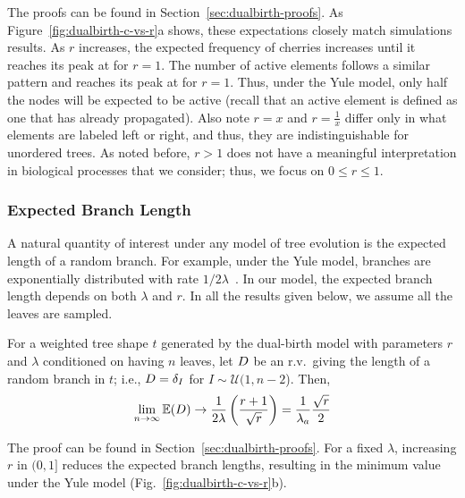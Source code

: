 The proofs can be found in Section~\ref{sec:dualbirth-proofs}.
As Figure~\ref{fig:dualbirth-c-vs-r}a shows, these expectations closely match simulations results. As $r$ increases, the expected frequency of cherries increases until it reaches its peak at  for $r=1$. The number of active elements follows a similar pattern and reaches its peak at   for $r=1$. Thus, under the Yule model, only half the nodes will be expected to be active (recall that an active element is defined as one that has already propagated). Also note $r=x$ and $r=\frac{1}{x}$ differ only in what elements are labeled left or right, and thus, they are indistinguishable for unordered trees. As noted before, $r>1$ does not have a meaningful interpretation in biological processes that we consider; thus, we focus on $0\leq r\leq1$.

\subsubsection{Expected Branch Length}
A natural quantity of interest under any model of tree evolution is the expected length of a random branch. For example, under the Yule model, branches are exponentially distributed with rate $1/2\lambda$~\cite{Mooers2012}. In our model, the expected branch length depends on both $\lambda$ and $r$. In all the results given below, we assume all the leaves are sampled. 
\begin{theorem}\label{thm:bl}
For a weighted tree shape $t$ generated by the dual-birth model with parameters $r$ and $\lambda$ conditioned on having $n$ leaves, let $D$ be an r.v.\ giving the length of a random branch in $t$; i.e., $D=\delta_I$ for $I\sim\mathcal{U}(1,n-2$). Then, 
\begin{align}\label{eq:bl}
\lim_{n\to\infty}\mathbb{E}(D) \to \frac{1}{2\lambda}\left(\frac{r+1}{\sqrt{r}}\right) = \frac{1}{\lambda_a}\frac{\sqrt{r}}{2}
\end{align}
\end{theorem}

The proof can be found in Section~\ref{sec:dualbirth-proofs}. For a fixed $\lambda$, increasing $r$ in $(0,1]$ reduces the expected branch lengths, resulting in the minimum value under the Yule model (Fig.~\ref{fig:dualbirth-c-vs-r}b).

